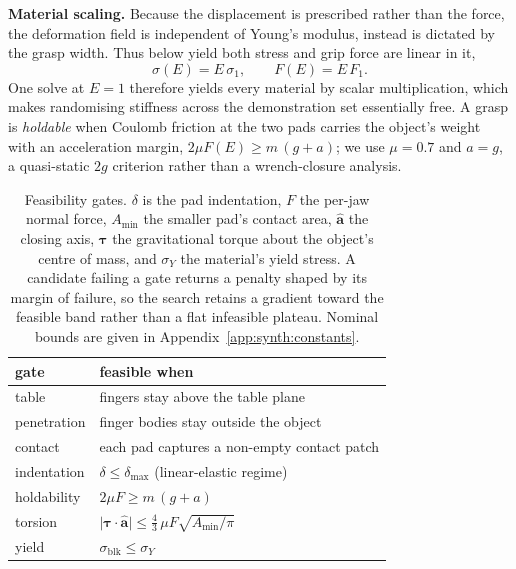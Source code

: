 \noindent\textbf{Material scaling.}
Because the displacement is prescribed rather than the force, the deformation field is
independent of Young's modulus, instead is dictated by the grasp width. Thus below yield both stress and grip force are linear in it,
\begin{equation}
  \sigma(E) = E\,\sigma_1, \qquad F(E) = E\,F_1 .
  \label{eq:E-linear}
\end{equation}
One solve at $E\!=\!1$ therefore yields every material by scalar multiplication, which makes
randomising stiffness across the demonstration set essentially free. A grasp is
\emph{holdable} when Coulomb friction at the two pads carries the object's weight with an
acceleration margin, $2\mu F(E) \ge m\,(g+a)$; we use $\mu\!=\!0.7$ and $a\!=\!g$, a quasi-static
$2g$ criterion rather than a wrench-closure analysis.


\begin{table}[t]\centering\footnotesize
\caption{Feasibility gates. $\delta$ is the pad indentation, $F$ the per-jaw normal force,
$A_{\min}$ the smaller pad's contact area, $\hat{\mathbf{a}}$ the closing axis,
$\boldsymbol{\tau}$ the gravitational torque about the object's centre of mass, and $\sigma_Y$ the
material's yield stress. A candidate failing a gate returns a penalty shaped by its margin of
failure, so the search retains a gradient toward the feasible band rather than a flat infeasible
plateau. Nominal bounds are given in Appendix~\ref{app:synth:constants}.}
\label{tab:gates}
\begin{tabular}{@{}ll@{}}
\toprule
gate & feasible when \\
\midrule
table       & fingers stay above the table plane \\
penetration & finger bodies stay outside the object \\
contact     & each pad captures a non-empty contact patch \\
indentation & $\delta \le \delta_{\max}$ (linear-elastic regime) \\
holdability & $2\mu F \ge m\,(g+a)$ \\
torsion     & $\bigl|\boldsymbol{\tau}\cdot\hat{\mathbf{a}}\bigr| \le
               \tfrac{4}{3}\,\mu F \sqrt{A_{\min}/\pi}$ \\
yield       & $\sigma_{\mathrm{blk}} \le \sigma_Y$ \\
\bottomrule
\end{tabular}
\end{table}

